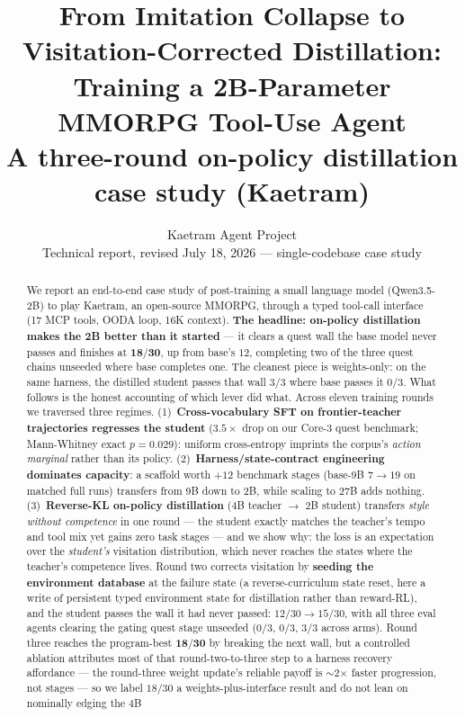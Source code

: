\documentclass[11pt]{article}
\title{From Imitation Collapse to Visitation-Corrected Distillation:\\
Training a 2B-Parameter MMORPG Tool-Use Agent\\
\large A three-round on-policy distillation case study (Kaetram)}
\author{Kaetram Agent Project\\ \small Technical report, revised July 18, 2026 --- single-codebase case study}
\date{}
\begin{document}
\maketitle

\begin{abstract}
We report an end-to-end case study of post-training a small language model (Qwen3.5-2B) to play
Kaetram, an open-source MMORPG, through a typed tool-call interface (17 MCP tools, OODA loop,
16K context). \textbf{The headline: on-policy distillation makes the 2B better than it started}
--- it clears a quest wall the base model never passes and finishes at $\mathbf{18/30}$, up from
base's $12$, completing two of the three quest chains unseeded where base completes one. The
cleanest piece is weights-only: on the same harness, the distilled student passes that wall $3/3$
where base passes it $0/3$. What follows is the honest accounting of which lever did what. Across
eleven training rounds we traversed three regimes. (1)~\textbf{Cross-vocabulary
SFT on frontier-teacher trajectories regresses the student} ($3.5\times$ drop on our Core-3 quest
benchmark; Mann-Whitney exact $p{=}0.029$): uniform cross-entropy imprints the corpus's
\emph{action marginal} rather than its policy. (2)~\textbf{Harness/state-contract engineering
dominates capacity}: a scaffold worth $+12$ benchmark stages (base-9B $7 \rightarrow 19$ on matched
full runs) transfers from 9B down to 2B, while scaling to 27B adds nothing. (3)~\textbf{Reverse-KL on-policy distillation} (4B teacher
$\rightarrow$ 2B student) transfers \emph{style without competence} in one round --- the student
exactly matches the teacher's tempo and tool mix yet gains zero task stages --- and we show why:
the loss is an expectation over the \emph{student's} visitation distribution, which never reaches
the states where the teacher's competence lives. Round two corrects visitation by
\textbf{seeding the environment database} at the failure state (a reverse-curriculum state reset,
here a write of persistent typed environment state for distillation rather than reward-RL), and
the student passes the wall it had never passed: $12/30 \rightarrow 15/30$, with all
three eval agents clearing the gating quest stage unseeded ($0/3$, $0/3$, $3/3$ across arms).
Round three reaches the program-best $\mathbf{18/30}$ by breaking the next wall, but a controlled
ablation attributes most of that round-two-to-three step to a harness recovery affordance --- the
round-three weight update's reliable payoff is $\sim$2$\times$ faster progression, not stages ---
so we label $18/30$ a weights-plus-interface result and do not lean on nominally edging the 4B

\end{abstract}
\end{document}
